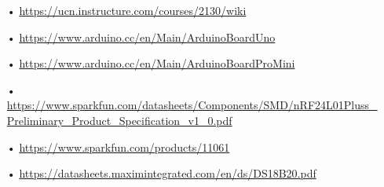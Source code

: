 \begin{enumerate}
	\item[•] \url{https://ucn.instructure.com/courses/2130/wiki}
	\item[•] \url{https://www.arduino.cc/en/Main/ArduinoBoardUno}
	\item[•] \url{https://www.arduino.cc/en/Main/ArduinoBoardProMini}
	\item[•] \url{https://www.sparkfun.com/datasheets/Components/SMD/nRF24L01Pluss_Preliminary_Product_Specification_v1_0.pdf}
	\item[•] \url{https://www.sparkfun.com/products/11061}
	\item[•] \url{https://datasheets.maximintegrated.com/en/ds/DS18B20.pdf}
\end{enumerate}


